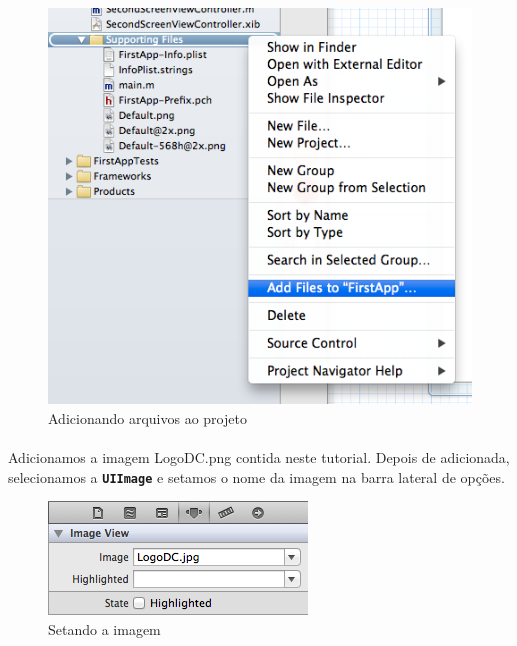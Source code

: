 \documentclass[a4paper,12pt,brazil,doubleside]{book}
\begin{document}
\begin{figure}[h]
  \centering
  \includegraphics[totalheight=0.3\textheight]{../figuras/ios/2/add_files.png}
  \caption{Adicionando arquivos ao projeto}
  \label{fig:a}
\end{figure}

\paragraph{}Adicionamos a imagem LogoDC.png contida neste tutorial. Depois de adicionada, selecionamos a \texttt{\textbf{UIImage}} e setamos o nome da imagem na barra lateral de opções.

\begin{figure}[h]
  \centering
  \includegraphics[totalheight=0.12\textheight]{../figuras/ios/2/image_path.png}
  \caption{Setando a imagem}
  \label{fig:a}
\end{figure}
\end{document}
